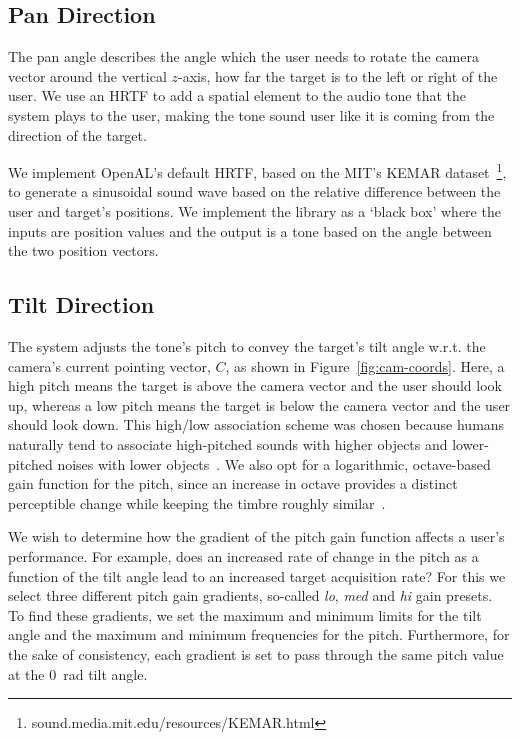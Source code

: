 \documentclass[format=sigconf, review=true, screen=true, anonymous=true]{acmart}
\begin{document}
\subsection{Pan Direction}

The pan angle describes the angle which the user needs to rotate the camera vector around the vertical $z$-axis, how far the target is to the left or right of the user. We use an HRTF to add a spatial element to the audio tone that the system plays to the user, making the tone sound user like it is coming from the direction of the target. 

We implement OpenAL's default HRTF, based on the MIT's KEMAR dataset~\footnote{sound.media.mit.edu/resources/KEMAR.html}, to generate a sinusoidal sound wave based on the relative difference between the user and target's positions. We implement the library as a `black box' where the inputs are position values and the output is a tone based on the angle between the two position vectors. 

\subsection{Tilt Direction}

The system adjusts the tone's pitch to convey the target's tilt angle w.r.t. the camera's current pointing vector, $C$, as shown in Figure~\ref{fig:cam-coords}. Here, a high pitch means the target is above the camera vector and the user should look up, whereas a low pitch means the target is below the camera vector and the user should look down. This high/low association scheme was chosen because humans naturally tend to associate high-pitched sounds with higher objects and lower-pitched noises with lower objects~\cite{pratt1930spatial, blauert1997spatial}. We also opt for a logarithmic, octave-based gain function for the pitch, since an increase in octave provides a distinct perceptible change while keeping the timbre roughly similar~\cite{shepard1964circularity}.

We wish to determine how the gradient of the pitch gain function affects a user's performance. For example, does an increased rate of change in the pitch as a function of the tilt angle lead to an increased target acquisition rate? For this we select three different pitch gain gradients, so-called \emph{lo}, \emph{med} and \emph{hi} gain presets. To find these gradients, we set the maximum and minimum limits for the tilt angle and the maximum and minimum frequencies for the pitch. Furthermore, for the sake of consistency, each gradient is set to pass through the same pitch value at the \SI{0}{\radian} tilt angle.   
\end{document}
